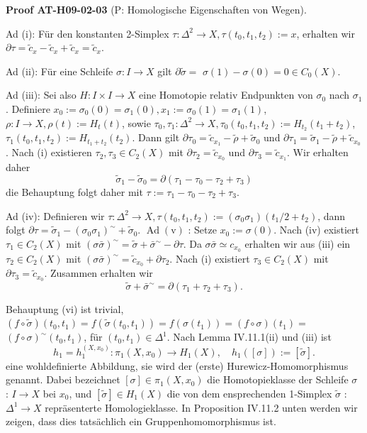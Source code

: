 \documentclass[10pt, letterpaper]{article}
\newcommand{\CustomHeading}[3]{%
  \par\medskip\noindent%
  \textbf{#1 #2} \textnormal{(#3)}.\enskip%
}
\newenvironment{PROOF}[2]{\CustomHeading{Proof}{#1}{#2}}{}
\begin{document}
\begin{PROOF}{AT-H09-02-03}{P: Homologische Eigenschaften von Wegen}
Ad (i): Für den konstanten 2-Simplex $\tau: \Delta^2 \rightarrow X, \tau\left(t_0, t_1, t_2\right):=x$, erhalten wir $\partial \tau=\tilde{c}_x-\tilde{c}_x+\tilde{c}_x=\tilde{c}_x$. 

Ad (ii): Für eine Schleife $\sigma: I \rightarrow X$ gilt $\partial \tilde{\sigma}=$ $\sigma(1)-\sigma(0)=0 \in C_0(X)$. 

Ad (iii): Sei also $H: I \times I \rightarrow X$ eine Homotopie relativ Endpunkten von $\sigma_0$ nach $\sigma_1$. Definiere $x_0:=\sigma_0(0)=\sigma_1(0), x_1:=\sigma_0(1)=\sigma_1(1)$, $\rho: I \rightarrow X, \rho(t):=H_t(t)$, sowie $\tau_0, \tau_1: \Delta^2 \rightarrow X, \tau_0\left(t_0, t_1, t_2\right):=H_{t_2}\left(t_1+t_2\right)$, $\tau_1\left(t_0, t_1, t_2\right):=H_{t_1+t_2}\left(t_2\right)$. Dann gilt $\partial \tau_0=\tilde{c}_{x_1}-\tilde{\rho}+\tilde{\sigma}_0$ und $\partial \tau_1=\tilde{\sigma}_1-\tilde{\rho}+\tilde{c}_{x_0}$. Nach (i) existieren $\tau_2, \tau_3 \in C_2(X)$ mit $\partial \tau_2=\tilde{c}_{x_0}$ und $\partial \tau_3=\tilde{c}_{x_1}$. Wir erhalten daher
$$
\tilde{\sigma}_1-\tilde{\sigma}_0=\partial\left(\tau_1-\tau_0-\tau_2+\tau_3\right)
$$
die Behauptung folgt daher mit $\tau:=\tau_1-\tau_0-\tau_2+\tau_3$. 

Ad (iv): Definieren wir $\tau: \Delta^2 \rightarrow X, \tau\left(t_0, t_1, t_2\right):=\left(\sigma_0 \sigma_1\right)\left(t_1 / 2+t_2\right)$, dann folgt $\partial \tau=\tilde{\sigma}_1-\left(\sigma_0 \sigma_1\right)^{\sim}+\tilde{\sigma}_0$. $\operatorname{Ad}(\mathrm{v})$ : Setze $x_0:=\sigma(0)$. Nach (iv) existiert $\tau_1 \in C_2(X)$ mit $(\sigma \bar{\sigma})^{\sim}=\tilde{\sigma}+\bar{\sigma}^{\sim}-\partial \tau$. Da $\sigma \bar{\sigma} \simeq c_{x_0}$ erhalten wir aus (iii) ein $\tau_2 \in C_2(X)$ mit $(\sigma \bar{\sigma})^{\sim}=\tilde{c}_{x_0}+\partial \tau_2$. Nach (i) existiert $\tau_3 \in C_2(X)$ mit $\partial \tau_3=\tilde{c}_{x_0}$. Zusammen erhalten wir
$$
\tilde{\sigma}+\bar{\sigma}^{\sim}=\partial\left(\tau_1+\tau_2+\tau_3\right) .
$$

Behauptung (vi) ist trivial, $(f \circ \tilde{\sigma})\left(t_0, t_1\right)=f\left(\tilde{\sigma}\left(t_0, t_1\right)\right)=f\left(\sigma\left(t_1\right)\right)=(f \circ \sigma)\left(t_1\right)=$ $(f \circ \sigma)^{\sim}\left(t_0, t_1\right)$, für $\left(t_0, t_1\right) \in \Delta^1$.
Nach Lemma IV.11.1(ii) und (iii) ist
$$
h_1=h_1^{\left(X, x_0\right)}: \pi_1\left(X, x_0\right) \rightarrow H_1(X), \quad h_1([\sigma]):=[\tilde{\sigma}] .
$$
eine wohldefinierte Abbildung, sie wird der (erste) Hurewicz-Homomorphismus genannt. Dabei bezeichnet $[\sigma] \in \pi_1\left(X, x_0\right)$ die Homotopieklasse der Schleife $\sigma$ : $I \rightarrow X$ bei $x_0$, und $[\tilde{\sigma}] \in H_1(X)$ die von dem ensprechenden 1-Simplex $\tilde{\sigma}$ : $\Delta^1 \rightarrow X$ repräsenterte Homologieklasse. In Proposition IV.11.2 unten werden wir zeigen, dass dies tatsächlich ein Gruppenhomomorphismus ist.
\end{PROOF}
\end{document}
